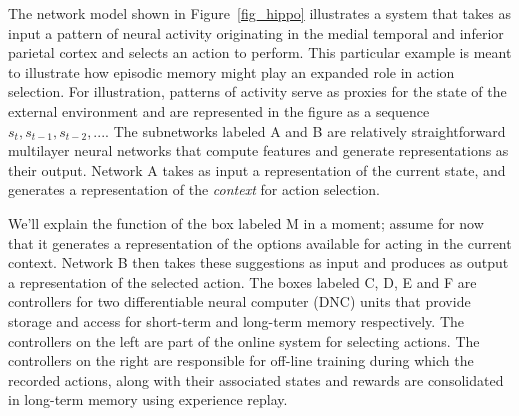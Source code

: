 \documentclass[letterpaper,11pt]{article}
\def\colorred#1{{\color{red}#1}}
\def\colorblu#1{{\color{blue}#1}}
\def\urlh#1{{}}
\begin{document}

The network model shown in Figure~{\urlh{#fig_Hippocampus_Inspired_Learning_Redux}{\ref{fig_hippo}}} illustrates a system that takes as input a pattern of neural activity originating in the medial temporal and inferior parietal cortex and selects an action to perform. This particular example is meant to illustrate how episodic memory might play an expanded role in action selection. For illustration, patterns of activity serve as proxies for the state of the external environment and are represented in the figure as a sequence $s_t, s_{t-1}, s_{t-2}, ...$. The subnetworks labeled \colorred{A} and \colorred{B} are relatively straightforward multilayer neural networks that compute features and generate representations as their output. Network \colorblu{A} takes as input a representation of the current state, and generates a representation of the {\it{context}} for action selection.


We'll explain the function of the box labeled \colorblu{M} in a moment; assume for now that it generates a representation of the options available for acting in the current context. Network \colorred{B} then takes these suggestions as input and produces as output a representation of the selected action. The boxes labeled \colorred{C}, \colorred{D}, \colorred{E} and \colorred{F} are controllers for two differentiable neural computer (DNC) units that provide storage and access for short-term and long-term memory respectively. The controllers on the left are part of the online system for selecting actions. The controllers on the right are responsible for off-line training during which the recorded actions, along with their associated states and rewards are consolidated in long-term memory using experience replay.
\end{document}
